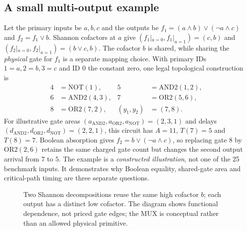\documentclass[journal,10pt]{IEEEtran}
\newcommand{\AND}{\mathrm{AND2}}
\newcommand{\OR}{\mathrm{OR2}}
\newcommand{\NOT}{\mathrm{NOT}}
\begin{document}
\subsection{A small multi-output example}
Let the primary inputs be $a,b,c$ and the outputs be $f_1=(a\land b)\lor(\neg a\land c)$ and $f_2=f_1\lor b$. Shannon cofactors at $a$ give $(f_1|_{a=0},f_1|_{a=1})=(c,b)$ and $(f_2|_{a=0},f_2|_{a=1})=(b\lor c,b)$. The cofactor $b$ is shared, while sharing the \emph{physical} gate for $f_1$ is a separate mapping choice. With primary IDs $1=a,2=b,3=c$ and ID $0$ the constant zero, one legal topological construction is
\begin{equation*}
\begin{aligned}
4&=\NOT(1), &5&=\AND(1,2),\\
6&=\AND(4,3), &7&=\OR(5,6),\\
8&=\OR(7,2), & (y_1,y_2)&=(7,8).
\end{aligned}
\end{equation*}
For illustrative gate areas $(a_\AND,a_\OR,a_\NOT)=(2,3,1)$ and delays $(d_\AND,d_\OR,d_\NOT)=(2,2,1)$, this circuit has $A=11$, $T(7)=5$ and $T(8)=7$. Boolean absorption gives $f_2=b\lor(\neg a\land c)$, so replacing gate $8$ by $\OR(2,6)$ retains the same charged gate count but changes the second output arrival from $7$ to $5$. The example is a \emph{constructed illustration}, not one of the 25 benchmark inputs. It demonstrates why Boolean equality, shared-gate area and critical-path timing are three separate questions.

\begin{figure}[!t]
\centering
{}
\caption{Two Shannon decompositions reuse the same high cofactor $b$; each output has a distinct low cofactor. The diagram shows functional dependence, not priced gate edges; the MUX is conceptual rather than an allowed physical primitive.}\label{fig:example}
\end{figure}
\end{document}
